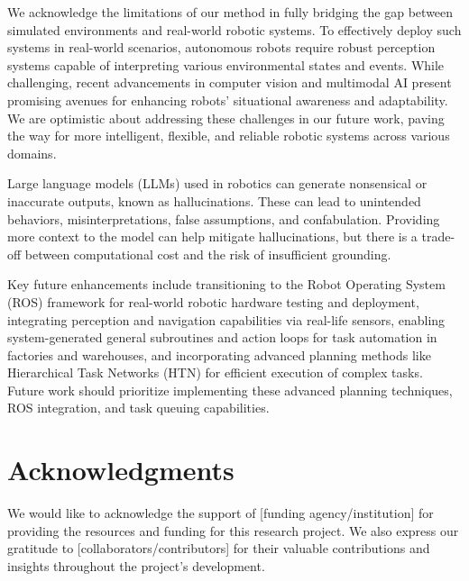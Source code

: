 \documentclass[pdflatex,sn-mathphys-num]{sn-jnl}%
\theoremstyle{thmstyleone}%
\theoremstyle{thmstyletwo}%
\theoremstyle{thmstylethree}%
\begin{document}
We acknowledge the limitations of our method in fully bridging the gap between simulated environments and real-world robotic systems. To effectively deploy such systems in real-world scenarios, autonomous robots require robust perception systems capable of interpreting various environmental states and events. While challenging, recent advancements in computer vision and multimodal AI present promising avenues for enhancing robots' situational awareness and adaptability. We are optimistic about addressing these challenges in our future work, paving the way for more intelligent, flexible, and reliable robotic systems across various domains.

Large language models (LLMs) used in robotics can generate nonsensical or inaccurate outputs, known as hallucinations. These can lead to unintended behaviors, misinterpretations, false assumptions, and confabulation. Providing more context to the model can help mitigate hallucinations, but there is a trade-off between computational cost and the risk of insufficient grounding.

Key future enhancements include transitioning to the Robot Operating System (ROS) framework for real-world robotic hardware testing and deployment, integrating perception and navigation capabilities via real-life sensors, enabling system-generated general subroutines and action loops for task automation in factories and warehouses, and incorporating advanced planning methods like Hierarchical Task Networks (HTN) for efficient execution of complex tasks. Future work should prioritize implementing these advanced planning techniques, ROS integration, and task queuing capabilities.
 
\section*{Acknowledgments}
We would like to acknowledge the support of [funding agency/institution] for providing the resources and funding for this research project. We also express our gratitude to [collaborators/contributors] for their valuable contributions and insights throughout the project's development.
\end{document}
